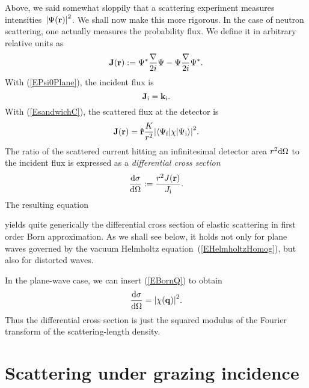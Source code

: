 Above, we said somewhat sloppily
that a scattering experiment measures intensities~${|\Psi(\mathbf{r})|}^2$.
We shall now make this more rigorous.
In the case of neutron scattering,
one actually measures the probability flux.
We define it in arbitrary relative units as
\begin{equation}
  \mathbf{J}(\mathbf{r}) := \Psi^*\frac{\mathbf{\nabla}}{2i}\Psi - \Psi\frac{\mathbf{\nabla}}{2i}\Psi^*.
\end{equation}
With (\ref{EPsi0Plane}), the incident flux is
\begin{equation}
  \mathbf{J}_\text{i} = \mathbf{k}_\text{i}.
\end{equation}
With (\ref{EsandwichC}), the scattered flux at the detector is
\begin{equation}\label{EJr}
  \mathbf{J}(\mathbf{r})
  = \mathbf{\hat r}\frac{K}{r^2}
    {\left|\langle\Psi_\text{f}|\chi|\Psi_\text{i}\rangle\right|}^2.
\end{equation}
The ratio of the scattered current hitting an infinitesimal detector area
$r^2{\rm d}\Omega$ to the incident flux is expressed as a
\textit{differential cross section}
\begin{equation}
  \frac{{\rm d}\sigma}{{\rm d}\Omega}
  := \frac{r^2 J(\mathbf{r})}{J_\text{i}}.
\end{equation}
The resulting equation

yields quite generically the differential cross section of elastic scattering
in first order Born approximation.
As we shall see below,
it holds not only for plane waves governed
by the vacuum Helmholtz equation~(\ref{EHelmholtzHomog}),
but also for distorted waves.

In the plane-wave case, we can insert (\ref{EBornQ}) to obtain
\begin{equation}\label{Ecross1}
  \frac{{\rm d}\sigma}{{\rm d}\Omega}
  = {\left| \chi(\mathbf{q}) \right|}^2.
\end{equation}
Thus the differential cross section is just the squared modulus
of the Fourier transform 
of the scattering-length density.


\section{Scattering under grazing incidence}\label{Sdwba}

